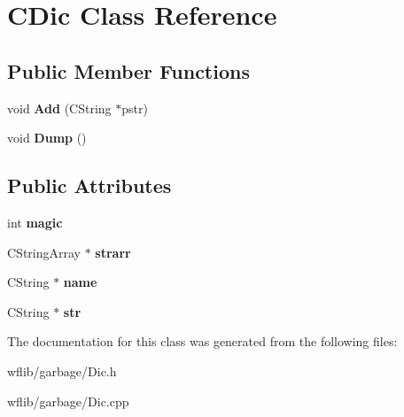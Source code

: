 \hypertarget{class_c_dic}{\section{C\-Dic Class Reference}
\label{class_c_dic}
}
\subsection*{Public Member Functions}
\begin{DoxyCompactItemize}
\item 
\hypertarget{class_c_dic_a7a7c24c59ffe3281c17799b26a221414}{void {\bfseries Add} (C\-String $\ast$pstr)}\label{class_c_dic_a7a7c24c59ffe3281c17799b26a221414}

\item 
\hypertarget{class_c_dic_a86cf47cd35456bb82a771afcd0a5c45c}{void {\bfseries Dump} ()}\label{class_c_dic_a86cf47cd35456bb82a771afcd0a5c45c}

\end{DoxyCompactItemize}
\subsection*{Public Attributes}
\begin{DoxyCompactItemize}
\item 
\hypertarget{class_c_dic_aa28c4494109e7287df401dee43eb3d4e}{int {\bfseries magic}}\label{class_c_dic_aa28c4494109e7287df401dee43eb3d4e}

\item 
\hypertarget{class_c_dic_a8395da26123a6987a60e3c50f470da6b}{C\-String\-Array $\ast$ {\bfseries strarr}}\label{class_c_dic_a8395da26123a6987a60e3c50f470da6b}

\item 
\hypertarget{class_c_dic_ad75171f7bfd2e1dcec371b97431fd3db}{C\-String $\ast$ {\bfseries name}}\label{class_c_dic_ad75171f7bfd2e1dcec371b97431fd3db}

\item 
\hypertarget{class_c_dic_ac07f555fe47354200728638d5bba0d4f}{C\-String $\ast$ {\bfseries str}}\label{class_c_dic_ac07f555fe47354200728638d5bba0d4f}

\end{DoxyCompactItemize}


The documentation for this class was generated from the following files\-:\begin{DoxyCompactItemize}
\item 
wflib/garbage/Dic.\-h\item 
wflib/garbage/Dic.\-cpp\end{DoxyCompactItemize}
